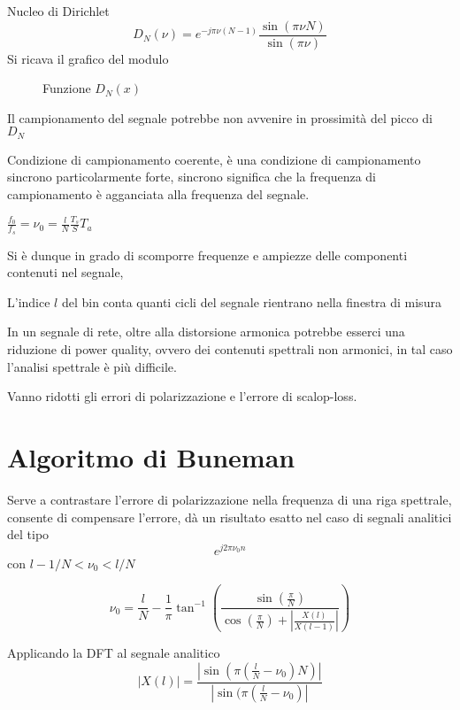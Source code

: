 Nucleo di Dirichlet
$$
D_N(\nu) = e^{-j\pi\nu(N-1)}\frac{\sin(\pi\nu N)}{\sin(\pi\nu)}
$$
Si ricava il grafico del modulo

\begin{figure}[h]
\centering
{}
  \caption{Funzione $D_N(x)$}
\end{figure}

Il campionamento del segnale potrebbe non avvenire in prossimità del picco di
$D_N$



Condizione di campionamento coerente, è una condizione di campionamento
sincrono particolarmente forte, sincrono significa che la frequenza di
campionamento è agganciata alla frequenza del segnale.

$\frac{f_0}{f_s} = \nu_0 = \frac{l}{N}\frac{T_s}S{T_a}$

Si è dunque in grado di scomporre frequenze e ampiezze delle componenti
contenuti nel segnale,



L'indice $l$ del bin conta quanti cicli del segnale rientrano nella finestra di
misura

In un segnale di rete, oltre alla distorsione armonica potrebbe esserci una
riduzione di power quality, ovvero dei contenuti spettrali non armonici, in tal
caso l'analisi spettrale è più difficile.

Vanno ridotti gli errori di polarizzazione e l'errore di scalop-loss.



\section{Algoritmo di Buneman}
Serve a contrastare l'errore di polarizzazione nella frequenza di una riga
spettrale, consente di compensare l'errore, dà un risultato esatto nel caso di
segnali analitici del tipo
$$
e^{j2\pi\nu_0n}
$$
con $l-1/N<\nu_0<l/N$

$$
\nu_0 = \frac{l}{N} - \frac{1}{\pi}\tan^{-1}\left(
\frac{\sin(\frac{\pi}{N})}{\cos(\frac{\pi}{N}) +
\left|\frac{X(l)}{X(l-1)}\right|}\right)
$$

Applicando la DFT al segnale analitico
$$
|X(l)|=\frac{|\sin(\pi(\frac{l}{N}-\nu_0)N)|}{|\sin(\pi(\frac{l}{N}-\nu_0)|}
$$



